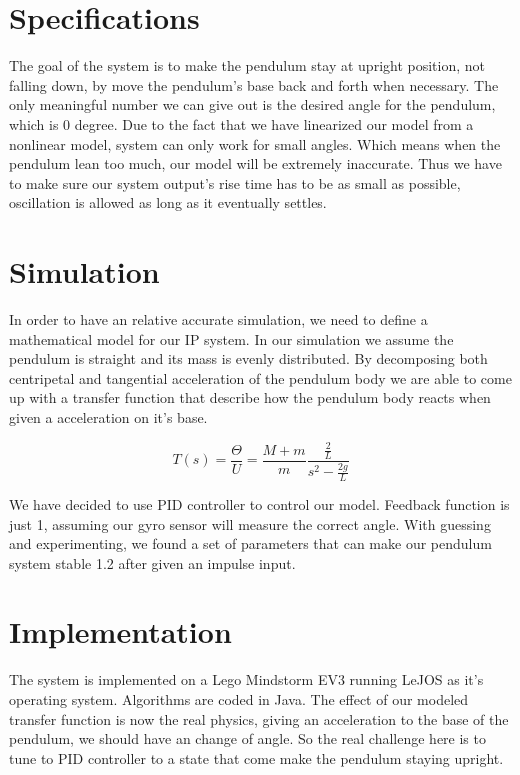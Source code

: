 \documentclass{notes}
\begin{document}

\section{Specifications}
The goal of the system is to make the pendulum stay at upright position, not falling down, by move
the pendulum's base back and forth when necessary. The only meaningful number we can give out is the
desired angle for the pendulum, which is 0 degree. Due to the fact that we have linearized our model from a
nonlinear model, system can only work for small angles. Which means when the pendulum lean too much,
our model will be extremely inaccurate. Thus we have to make sure our system output's rise time has
to be as small as possible, oscillation is allowed as long as it eventually settles.


\section{Simulation}
In order to have an relative accurate simulation, we need to define a mathematical model for our
IP system. In our simulation we assume the pendulum is straight and its mass is evenly distributed.
By decomposing both centripetal and tangential acceleration of the pendulum body we are able to come
up with a transfer function that describe how the pendulum body reacts when given a acceleration on
it's base.

\[
  T(s) = \dfrac{\Theta}{U} = \dfrac{M+m}{m}\dfrac{\frac{2}{L}}{s^2-\frac{2g}{L}}
\]

We have decided to use PID controller to control our model. Feedback function is just 1, assuming
our gyro sensor will measure the correct angle. With guessing and experimenting, we found a set of
parameters that can make our pendulum system stable 1.2 after given an impulse input.

\section{Implementation}

The system is implemented on a Lego Mindstorm EV3 running LeJOS as it's operating system. Algorithms
are coded in Java. The effect of our modeled transfer function is now the real physics, giving an
acceleration to the base of the pendulum, we should have an change of angle. So the real challenge
here is to tune to PID controller to a state that come make the pendulum staying upright. 
\end{document}
